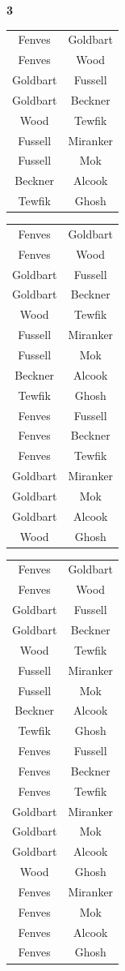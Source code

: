 \documentclass[12pt, letterpaper, fleqn]{article}
\begin{document}
  \textbf{3} \\
\begin{tabular} { c | c }
  Fenves  & Goldbart \\
  Fenves & Wood \\
  Goldbart & Fussell \\
  Goldbart & Beckner \\
  Wood & Tewfik \\
  Fussell & Miranker \\
  Fussell & Mok \\
  Beckner & Alcook \\
  Tewfik & Ghosh 
\end{tabular} 
\begin{tabular} { c | c }
  Fenves  & Goldbart \\
  Fenves & Wood \\
  Goldbart & Fussell \\
  Goldbart & Beckner \\
  Wood & Tewfik \\
  Fussell & Miranker \\
  Fussell & Mok \\
  Beckner & Alcook \\
  Tewfik & Ghosh  \\

  Fenves  & Fussell \\
  Fenves  & Beckner \\
  Fenves & Tewfik \\
  Goldbart & Miranker \\
  Goldbart & Mok \\
  Goldbart & Alcook \\
  Wood & Ghosh \\
\end{tabular} 
\begin{tabular} { c | c }
  Fenves  & Goldbart \\
  Fenves & Wood \\
  Goldbart & Fussell \\
  Goldbart & Beckner \\
  Wood & Tewfik \\
  Fussell & Miranker \\
  Fussell & Mok \\
  Beckner & Alcook \\
  Tewfik & Ghosh  \\

  Fenves  & Fussell \\
  Fenves  & Beckner \\
  Fenves & Tewfik \\
  Goldbart & Miranker \\
  Goldbart & Mok \\
  Goldbart & Alcook \\
  Wood & Ghosh \\
  
  Fenves & Miranker \\
  Fenves & Mok \\
  Fenves & Alcook \\
  Fenves & Ghosh \\
\end{tabular} 
\end{document}
